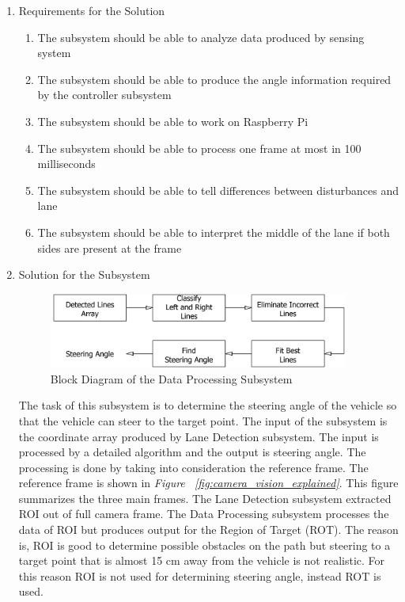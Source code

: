 \documentclass[a4paper,12pt]{article}
\begin{document}
		\begin{enumerate}
			\item {Requirements for the Solution}
			
				\begin{enumerate}
					\item The subsystem should be able to analyze data produced by sensing system
					\item The subsystem should be able to produce the angle information required by the controller subsystem
					\item The subsystem should be able to work on Raspberry Pi
					\item The subsystem should be able to process one frame at most in 100 milliseconds
					\item The subsystem should be able to tell differences between disturbances and lane
					\item The subsystem should be able to interpret the middle of the lane if both sides are present at the frame
				\end{enumerate}
				
			\item {Solution for the Subsystem}
			\begin{figure}[h]
				\includegraphics[width=0.93\textwidth,center]{images/vModels/dataProcessing_subsystem}
				\caption{Block Diagram of the Data Processing Subsystem}\label{fig:dataProcessing_subsystem}
			\end{figure}
The task of this subsystem is to determine the steering angle of the vehicle so that the vehicle can steer to the target point. The input of the subsystem is the coordinate array produced by Lane Detection subsystem. The input is processed by a detailed algorithm and the output is steering angle. The processing is done by taking into consideration the reference frame. The reference frame is shown in \textit{Figure ~\ref{fig:camera_vision_explained}}. This figure summarizes the three main frames. The Lane Detection subsystem extracted ROI out of full camera frame. The Data Processing subsystem processes the data of ROI but produces output for the Region of Target (ROT). The reason is, ROI is good to determine possible obstacles on the path but steering to a target point that is almost 15 cm away from the vehicle is not realistic.  For this reason ROI is not used for determining steering angle, instead ROT is used.
			

\end{enumerate}
\end{document}
